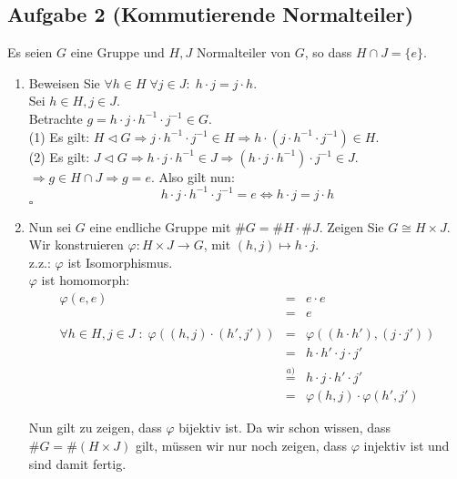 \documentclass[11pt,a4paper,ngerman]{article}
\begin{document}
\subsection*{Aufgabe 2 \mdseries (Kommutierende Normalteiler)}
Es seien $G$ eine Gruppe und $H,J$ Normalteiler von $G$, so dass $H \cap J = \{e\}$.
\begin{enumerate}[\bfseries a)]
\item  Beweisen Sie $\forall h \in H \; \forall j \in J :\; h \cdot j = j \cdot h$. \\

Sei $h \in H, j \in J$. \\
Betrachte $g = h \cdot j \cdot h^{-1} \cdot j^{-1} \in G$. \\
(1) Es gilt: $H \lhd G \Rightarrow j \cdot h^{-1} \cdot j^{-1} \in H \Rightarrow h \cdot (j \cdot h^{-1} \cdot j^{-1}) \in H$. \\
(2) Es gilt: $J \lhd G \Rightarrow h \cdot j \cdot h^{-1} \in J \Rightarrow (h \cdot j \cdot h^{-1}) \cdot j^{-1} \in J$. \\
$\Rightarrow g \in H \cap J \Rightarrow g = e$.
Also gilt nun:
$$
h \cdot j \cdot h^{-1} \cdot j^{-1} = e \Leftrightarrow h \cdot j = j \cdot h
$$
\mbox{} \hfill $\square$
\item  Nun sei $G$ eine endliche Gruppe mit $\#G = \#H \cdot \#J$. Zeigen Sie $G \cong H \times J$. \\

Wir konstruieren $\varphi : H \times J \rightarrow G$, mit $(h,j) \mapsto h \cdot j$.\\
z.z.: $\varphi$ ist Isomorphismus.\\

$\varphi$ ist homomorph:\\
$$
\begin{array}{rcl}
\varphi(e,e) &=& e \cdot e\\
&=& e\\
\\
\forall h\in H, j \in J \;:\;\varphi((h , j) \cdot (h' , j')) &=& \varphi \left((h \cdot h') , (j \cdot j')\right) \\
&=& h \cdot h' \cdot j \cdot j'\\
&\stackrel{a)}{=}& h \cdot j \cdot h' \cdot j'\\
&=& \varphi(h,j) \cdot \varphi(h',j') 
\end{array}
$$

Nun gilt zu zeigen, dass $\varphi$ bijektiv ist. Da wir schon wissen, dass $\# G = \# (H \times J)$ gilt, müssen wir nur noch zeigen, dass $\varphi$ injektiv ist und sind damit fertig.\\


\end{enumerate}
\end{document}
